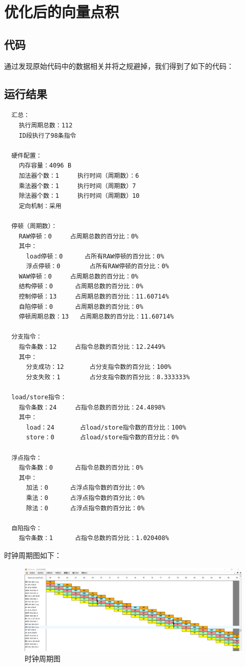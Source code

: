 \documentclass[blue,normal,cn]{elegantnote}
\begin{document}
\section{优化后的向量点积}

\subsection{代码}

通过发现原始代码中的数据相关并将之规避掉，我们得到了如下的代码：



\subsection{运行结果}

\begin{lstlisting}
  汇总：
    执行周期总数：112
    ID段执行了98条指令

  硬件配置：
    内存容量：4096 B
    加法器个数：1		执行时间（周期数）：6
    乘法器个数：1		执行时间（周期数）7		
    除法器个数：1		执行时间（周期数）10		
    定向机制：采用

  停顿（周期数）：
    RAW停顿：0		占周期总数的百分比：0%
    其中：
      load停顿：0		占所有RAW停顿的百分比：0%
      浮点停顿：0		占所有RAW停顿的百分比：0%
    WAW停顿：0		占周期总数的百分比：0%
    结构停顿：0		占周期总数的百分比：0%
    控制停顿：13		占周期总数的百分比：11.60714%
    自陷停顿：0		占周期总数的百分比：0%
    停顿周期总数：13	占周期总数的百分比：11.60714%

  分支指令：
    指令条数：12		占指令总数的百分比：12.2449%
    其中：
      分支成功：12		占分支指令数的百分比：100%
      分支失败：1		占分支指令数的百分比：8.333333%

  load/store指令：
    指令条数：24		占指令总数的百分比：24.4898%
    其中：
      load：24		占load/store指令数的百分比：100%
      store：0		占load/store指令数的百分比：0%

  浮点指令：
    指令条数：0		占指令总数的百分比：0%
    其中：
      加法：0		占浮点指令数的百分比：0%
      乘法：0		占浮点指令数的百分比：0%
      除法：0		占浮点指令数的百分比：0%

  自陷指令：
    指令条数：1		占指令总数的百分比：1.020408%
\end{lstlisting}

时钟周期图如下：

\begin{figure}[H]
    \centering
    \includegraphics[width=.8\textwidth]{fig/prod_bypass.png}
    \caption{时钟周期图}
    \label{fig:prod_bypass}
\end{figure}
\end{document}
